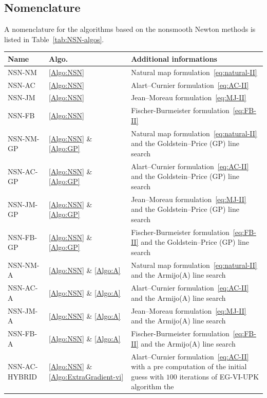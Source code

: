 \subsection{Nomenclature}
A nomenclature for the algorithms based on the nonsmooth Newton methods is  listed in Table~\ref{tab:NSN-algos}.
\begin{table}[htbp]
  \centering
  \begin{tabular}{|l|l|p{}|}
    \hline
    {Name}
    & Algo.
    & Additional informations
    \\
    \hline
    \hline
    \sf NSN-NM
    & \ref{Algo:NSN} 
    & Natural map formulation~\eqref{eq:natural-II}
    \\
    \hline
    \sf NSN-AC
    & \ref{Algo:NSN} 
    & Alart--Curnier formulation~\eqref{eq:AC-II}
    \\
    \hline
    \sf NSN-JM
    & \ref{Algo:NSN} 
    & Jean--Moreau formulation~\eqref{eq:MJ-II}
    \\
    \hline
    \sf NSN-FB
    & \ref{Algo:NSN}
    & Fischer-Burmeister formulation~\eqref{eq:FB-II}
    \\
    \hline
    \sf NSN-NM-GP
    & \ref{Algo:NSN} \& \ref{Algo:GP}
    &  Natural map formulation~\eqref{eq:natural-II} and the Goldstein--Price (GP) line search
    \\
    \hline
    \sf NSN-AC-GP
    & \ref{Algo:NSN} \& \ref{Algo:GP}
    &  Alart--Curnier formulation~\eqref{eq:AC-II} and the Goldstein--Price (GP) line search
    \\
    \hline
    \sf NSN-JM-GP
    & \ref{Algo:NSN} \& \ref{Algo:GP}
    & Jean--Moreau formulation~\eqref{eq:MJ-II} and the Goldstein--Price (GP) line search
    \\
    \hline
    \sf NSN-FB-GP
    & \ref{Algo:NSN} \& \ref{Algo:GP}
    & Fischer-Burmeister formulation~\eqref{eq:FB-II} and the Goldstein--Price (GP) line search
    \\
    \hline
    \sf NSN-NM-A
    & \ref{Algo:NSN} \& \ref{Algo:A}
    &  Natural map formulation~\eqref{eq:natural-II} and the Armijo(A) line search
    \\
    \hline
    \sf NSN-AC-A
    & \ref{Algo:NSN} \& \ref{Algo:A}
    &  Alart--Curnier formulation~\eqref{eq:AC-II} and the Armijo(A) line search
    \\
    \hline
    \sf NSN-JM-A
    & \ref{Algo:NSN} \& \ref{Algo:A}
    & Jean--Moreau formulation~\eqref{eq:MJ-II} and the Armijo(A) line search
    \\
    \hline
    \sf NSN-FB-A
    & \ref{Algo:NSN} \& \ref{Algo:A}
    & Fischer-Burmeister formulation~\eqref{eq:FB-II} and the Armijo(A) line search
    \\
    \hline
    \sf NSN-AC-HYBRID
    & \ref{Algo:NSN} \& \ref{Algo:ExtraGradient-vi}
    & Alart--Curnier formulation~\eqref{eq:AC-II} with a pre computation of the initial guess with $100$ iterations of {\sf EG-VI-UPK} algorithm
      the
    \\
    \hline


\end{tabular}
\end{table}
